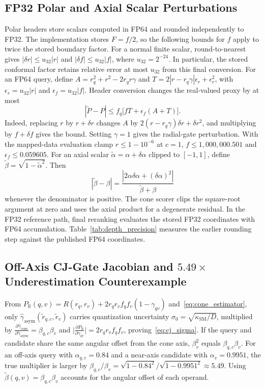 \subsection{FP32 Polar and Axial Scalar Perturbations}
\label{app:scalar_rounding}
Polar headers store scalars computed in FP64 and rounded independently to FP32. The implementation stores $F=f/2$, so the following bounds for $f$ apply to twice the stored boundary factor. For a normal finite scalar, round-to-nearest gives $|\delta r|\le u_{32}|r|$ and $|\delta f|\le u_{32}|f|$, where $u_{32}=2^{-24}$. In particular, the stored conformal factor retains relative error at most $u_{32}$ from this final conversion.
For an FP64 query, define $A=r_q^2+r^2-2r_qr\gamma$ and $T=2|r-r_q\gamma|\epsilon_r+\epsilon_r^2$, with $\epsilon_r=u_{32}|r|$ and $\epsilon_f=u_{32}|f|$. Header conversion changes the real-valued proxy by at most
\begin{equation}
 |\widetilde P-P|\le f_q\bigl[fT+\epsilon_f(A+T)\bigr].
 \label{eq:header_rounding}
\end{equation}
Indeed, replacing $r$ by $r+\delta r$ changes $A$ by $2(r-r_q\gamma)\delta r+\delta r^2$, and multiplying by $f+\delta f$ gives the bound. Setting $\gamma=1$ gives the radial-gate perturbation. With the mapped-data evaluation clamp $r\le1-10^{-6}$ at $c=1$, $f\le1{,}000{,}000.501$ and $\epsilon_f\le0.059605$.
For an axial scalar $\tilde\alpha=\alpha+\delta\alpha$ clipped to $[-1,1]$, define $\tilde\beta=\sqrt{1-\tilde\alpha^2}$. Then
\begin{equation}
 |\tilde\beta-\beta|
 =\frac{|2\alpha\delta\alpha+(\delta\alpha)^2|}{\tilde\beta+\beta}
 \label{eq:axial_rounding}
\end{equation}
whenever the denominator is positive. The cone scorer clips the square-root argument at zero and uses the axial product for a degenerate residual. In the FP32 reference path, final reranking evaluates the stored FP32 coordinates with FP64 accumulation. Table~\ref{tab:depth_precision} measures the earlier rounding step against the published FP64 coordinates.

\subsection{Off-Axis CJ-Gate Jacobian and $5.49\times$ Underestimation Counterexample}
From $P_{\mathbb{B}}(q, v) = R(r_q, r_v) + 2 r_q r_v f_q f_v(1 - \gamma_{qv})$ and~\eqref{eq:cone_estimator}, only $\hat{\gamma}_{\mathrm{asym}}(\tilde{r}_{q,c}, \tilde{r}_v)$ carries quantization uncertainty $\sigma_0 = \sqrt{\kappa_{\mathrm{SM}}/D}$, multiplied by $\frac{\partial \hat{\gamma}_{\mathrm{cone}}}{\partial \hat{\gamma}_{\mathrm{asym}}} = \beta_{q,c}\beta_v$ and $\bigl|\frac{\partial P_{\mathbb{B}}}{\partial \gamma_{qv}}\bigr| = 2 r_q r_v f_q f_v$, proving~\eqref{eq:cj_sigma}.
If the query and candidate share the same angular offset from the cone axis, $\beta_v^2$ equals $\beta_{q,c}\beta_v$. For an off-axis query with $\alpha_{q,c}=0.84$ and a near-axis candidate with $\alpha_v=0.9951$, the true multiplier is larger by $\beta_{q,c}/\beta_v=\sqrt{1-0.84^2}/\sqrt{1-0.9951^2}\approx5.49$.
Using $\tilde{\beta}(q,v)=\beta_{q,c}\beta_v$ accounts for the angular offset of each operand.

